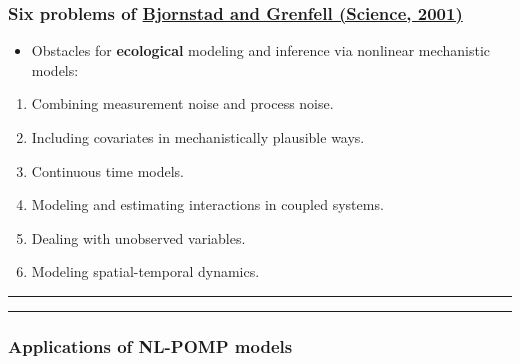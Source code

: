 \documentclass[]{article}
\providecommand{\tightlist}{%
  \setlength{\itemsep}{0pt}\setlength{\parskip}{0pt}}
\begin{document}
\subsubsection{\texorpdfstring{Six problems of
\href{http://dx.doi.org/10.1126/science.1062226}{Bjornstad and Grenfell
(Science,
2001)}}{Six problems of Bjornstad and Grenfell (Science, 2001)}}\label{six-problems-of-bjornstad-and-grenfell-science-2001}

\begin{itemize}
\tightlist
\item
  Obstacles for \textbf{ecological} modeling and inference via nonlinear
  mechanistic models:
\end{itemize}

\begin{enumerate}
\def\labelenumi{\arabic{enumi}.}
\item
  Combining measurement noise and process noise.
\item
  Including covariates in mechanistically plausible ways.
\item
  Continuous time models.
\item
  Modeling and estimating interactions in coupled systems.
\item
  Dealing with unobserved variables.
\item
  Modeling spatial-temporal dynamics.
\end{enumerate}

\begin{center}\rule{0.5\linewidth}{\linethickness}\end{center}

\begin{center}\rule{0.5\linewidth}{\linethickness}\end{center}

\subsubsection{Applications of NL-POMP
models}\label{applications-of-nl-pomp-models}
\end{document}
